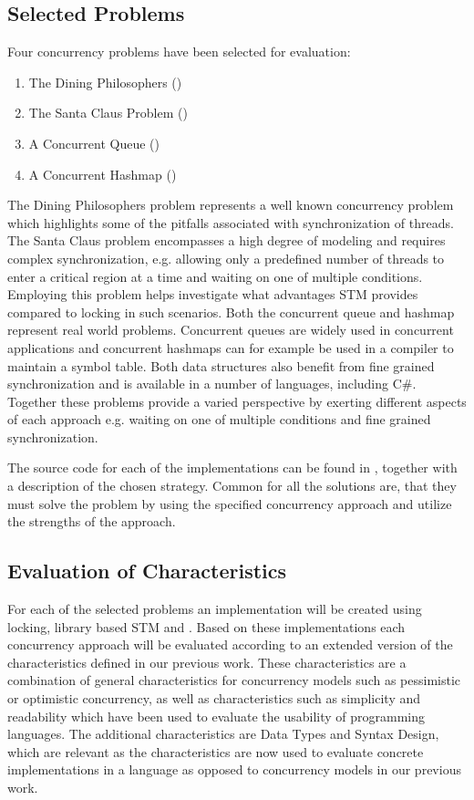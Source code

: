 \subsection{Selected Problems}\label{sec:eval_selected_problems}
Four concurrency problems have been selected for evaluation:
\begin{enumerate}
\item The Dining Philosophers ()
\item The Santa Claus Problem ()
\item A Concurrent Queue ()
\item A Concurrent Hashmap ()
\end{enumerate}
The Dining Philosophers problem represents a well known concurrency problem which highlights some of the pitfalls associated with synchronization of threads. The Santa Claus problem encompasses a high degree of modeling and requires complex synchronization, e.g. allowing only a predefined number of threads to enter a critical region at a time and waiting on one of multiple conditions. Employing this problem helps investigate what advantages \ac{STM} provides compared to locking in such scenarios. Both the concurrent queue and hashmap represent real world problems. Concurrent queues are widely used in concurrent applications\cite{michael1996simple} and concurrent hashmaps can for example be used in a compiler to maintain a symbol table\cite{cormen2009introduction}. Both data structures also benefit from fine grained synchronization and is available in a number of languages, including C\#. Together these problems provide a varied perspective by exerting different aspects of each approach e.g. waiting on one of multiple conditions and fine grained synchronization.

The source code for each of the implementations can be found in , together with a description of the chosen strategy. Common for all the solutions are, that they must solve the problem by using the specified concurrency approach and utilize the strengths of the approach.

\subsection{Evaluation of Characteristics}\label{sec:eval_chars}
For each of the selected problems an implementation will be created using locking, library based \ac{STM} and \stmname. Based on these implementations each concurrency approach will be evaluated according to an extended version of the characteristics defined in our previous work\cite[p. 15-21]{dpt907e14trending}. These characteristics are a combination of general characteristics for concurrency models such as pessimistic or optimistic concurrency, as well as characteristics such as simplicity and readability which have been used to evaluate the usability of programming languages\cite[p. 7]{sebestaProLang}. The additional characteristics are Data Types and Syntax Design, which are relevant as the characteristics are now used to evaluate concrete implementations in a language as opposed to concurrency models in our previous work\cite{dpt907e14trending}.

